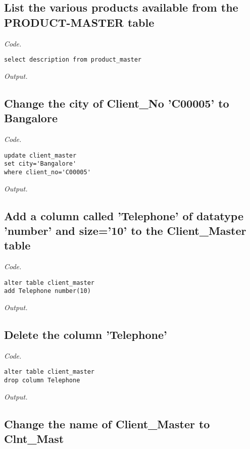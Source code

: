 \documentclass[12pt]{article}
\begin{document}
\subsection{List the various products available from the PRODUCT-MASTER table}

\textit{Code.}

\begin{lstlisting}
select description from product_master
\end{lstlisting}

\textit{Output.}\\

\subsection{Change the city of Client\_No 'C00005' to Bangalore}

\textit{Code.}

\begin{lstlisting}
update client_master
set city='Bangalore'
where client_no='C00005'
\end{lstlisting}

\textit{Output.}\\

\subsection{Add a column called 'Telephone' of datatype 'number' and size='10' to the Client\_Master table}

\textit{Code.}

\begin{lstlisting}
alter table client_master
add Telephone number(10)
\end{lstlisting}

\textit{Output.}\\

\subsection{Delete the column 'Telephone'}

\textit{Code.}

\begin{lstlisting}
alter table client_master
drop column Telephone
\end{lstlisting}

\textit{Output.}\\

\subsection{Change the name of Client\_Master to Clnt\_Mast}
\end{document}
